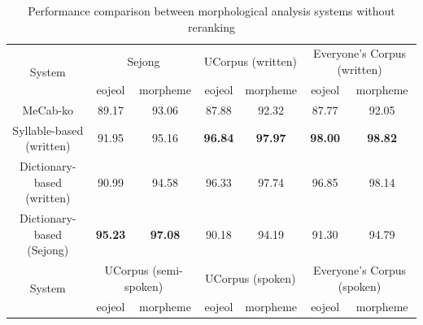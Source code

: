 \documentclass[AMS,STIX2COL]{WileyNJD-v2}
\begin{document}
    \begin{table}[ht]
        \caption{Performance comparison between morphological analysis systems without reranking}
        \label{tab:performance-without-reranking}
        \begin{tabular*}{500pt}{@{\extracolsep\fill}c|cccccc@{\extracolsep\fill}}
            \toprule
            \multirow{2}{*}{System}                & \multicolumn{2}{c}{Sejong}                                & \multicolumn{2}{c}{UCorpus (written)}                     & \multicolumn{2}{c}{Everyone's Corpus (written)}           \\
            \cmidrule{2-3} \cmidrule{4-5} \cmidrule{6-7}
            ~                                      & \multicolumn{1}{c}{eojeol} & \multicolumn{1}{c}{morpheme} & \multicolumn{1}{c}{eojeol} & \multicolumn{1}{c}{morpheme} & \multicolumn{1}{c}{eojeol} & \multicolumn{1}{c}{morpheme} \\
            \midrule
            \hspace{2mm}MeCab-ko                   & 89.17                      & 93.06                        & 87.88                      & 92.32                        & 87.77                      & 92.05                        \\
            \hspace{2mm}Syllable-based (written)   & 91.95                      & 95.16                        & \textbf{96.84}             & \textbf{97.97}               & \textbf{98.00}             & \textbf{98.82}               \\
            \hspace{2mm}Dictionary-based (written) & 90.99                      & 94.58                        & 96.33                      & 97.74                        & 96.85                      & 98.14                        \\
            \hspace{2mm}Dictionary-based (Sejong)  & \textbf{95.23}             & \textbf{97.08}               & 90.18                      & 94.19                        & 91.30                      & 94.79                        \\
            \toprule
            \multirow{2}{*}{System}                & \multicolumn{2}{c}{UCorpus (semi-spoken)}                 & \multicolumn{2}{c}{UCorpus (spoken)}                      & \multicolumn{2}{c}{Everyone's Corpus (spoken)}            \\
            \cmidrule{2-3} \cmidrule{4-5} \cmidrule{6-7}
            ~                                      & \multicolumn{1}{c}{eojeol} & \multicolumn{1}{c}{morpheme} & \multicolumn{1}{c}{eojeol} & \multicolumn{1}{c}{morpheme} & \multicolumn{1}{c}{eojeol} & \multicolumn{1}{c}{morpheme} \\

\end{tabular*}
\end{table}
\end{document}
